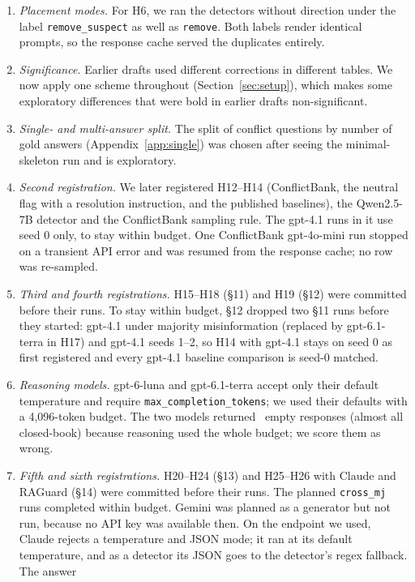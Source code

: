\begin{enumerate}[leftmargin=*,itemsep=1pt,topsep=2pt]
lenient. We now report the pre-registered test (actual effect inside a bootstrap prediction interval) and a paired test
of the two spaces' errors.
\item \emph{Placement modes.} For H6, we ran the detectors without direction under the label
\texttt{remove\_suspect} as well as \texttt{remove}. Both labels render identical prompts, so the response cache served the
duplicates entirely.
\item \emph{Significance.} Earlier drafts used different corrections in different tables. We now apply one scheme
throughout (Section~\ref{sec:setup}), which makes some exploratory differences that were bold in earlier drafts
non-significant.
\item \emph{Single- and multi-answer split.} The split of conflict questions by number of gold answers
(Appendix~\ref{app:single}) was chosen after seeing the minimal-skeleton run and is exploratory.
\item \emph{Second registration.} We later registered H12--H14 (ConflictBank, the neutral flag with a
resolution instruction, and the published baselines), the Qwen2.5-7B detector and the ConflictBank sampling rule.
The gpt-4.1 runs in it use seed 0 only, to stay within budget. One ConflictBank gpt-4o-mini run stopped on a
transient API error and was resumed from the response cache; no row was re-sampled.
\item \emph{Third and fourth registrations.} H15--H18 (\S11) and H19 (\S12) were committed before their runs. To stay
within budget, \S12 dropped two \S11 runs before they started: gpt-4.1 under majority misinformation (replaced by
gpt-6.1-terra in H17) and gpt-4.1 seeds 1--2, so H14 with gpt-4.1 stays on seed 0 as first registered and every
gpt-4.1 baseline comparison is seed-0 matched.
\item \emph{Reasoning models.} gpt-6-luna and gpt-6.1-terra accept only their default temperature and require
\texttt{max\_completion\_tokens}; we used their defaults with a 4,096-token budget. The two models returned
\Nempty\ empty responses (almost all closed-book) because reasoning used the whole budget; we score them as wrong.
\item \emph{Fifth and sixth registrations.} H20--H24 (\S13) and H25--H26 with Claude and RAGuard (\S14) were
committed before their runs. The planned \texttt{cross\_mj} runs completed within budget. Gemini was planned
as a generator but not run, because no API key was available then. On the endpoint we used, Claude rejects a temperature and JSON mode; it
ran at its default temperature, and as a detector its JSON goes to the detector's regex fallback. The answer

\end{enumerate}
